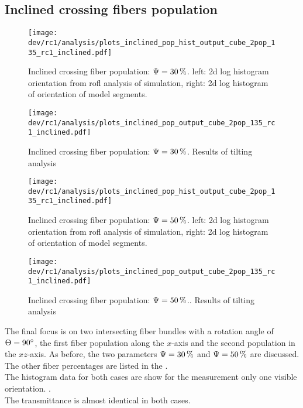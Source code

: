 \subsection{Inclined crossing fibers population}
\label{sec:resInclCross}
%
\begin{figure}[!t]
\centering
\texttt{[image: dev/rc1/analysis/plots\_inclined\_pop\_hist\_output\_cube\_2pop\_135\_rc1\_inclined.pdf]}
\caption[sim]{Inclined crossing fiber population: $\textnormal{$\Psi$}=\SI{30}{\percent}$. left: 2d log histogram orientation from rofl analysis of simulation, right: 2d log histogram of orientation of model segments. }
\label{fig:inclined_03_fiber_pop_hist}
\end{figure}
%
\begin{figure}[!p]
\centering
\texttt{[image: dev/rc1/analysis/plots\_inclined\_pop\_output\_cube\_2pop\_135\_rc1\_inclined.pdf]}
\caption[]{Inclined crossing fiber population: $\textnormal{$\Psi$}=\SI{30}{\percent}$. Results of tilting analysis}
\label{fig:inclined_03_fiber_pop_rofl}
\end{figure}
%
\begin{figure}[!t]
\centering
\texttt{[image: dev/rc1/analysis/plots\_inclined\_pop\_hist\_output\_cube\_2pop\_135\_rc1\_inclined.pdf]}
\caption[sim]{Inclined crossing fiber population: $\textnormal{$\Psi$}=\SI{50}{\percent}$. left: 2d log histogram orientation from rofl analysis of simulation, right: 2d log histogram of orientation of model segments. }
\label{fig:inclined_05_fiber_pop_hist}
\end{figure}
%
\begin{figure}[!p]
\centering
\texttt{[image: dev/rc1/analysis/plots\_inclined\_pop\_output\_cube\_2pop\_135\_rc1\_inclined.pdf]}
\caption[]{Inclined crossing fiber population: $\textnormal{$\Psi$}=\SI{50}{\percent}$.. Results of tilting analysis}
\label{fig:inclined_05_fiber_pop_rofl}
\end{figure}
%
%
The final focus is on two intersecting fiber bundles with a rotation angle of $\textnormal{$\Theta$} = \SI{90}{\degree}$, \ie{} the first fiber population along the $x$-axis and the second population in the $xz$-axis.
As before, the two parameters $\textnormal{$\Psi$} = \SI{30}{\percent}$ and $\textnormal{$\Psi$} = \SI{50}{\percent}$ are discussed.
The other fiber percentages are listed in the .
\\
%
The histogram data for both cases are show for the measurement only one visible orientation.
\dummy{}.
\\
The transmittance is almost identical in both cases.
